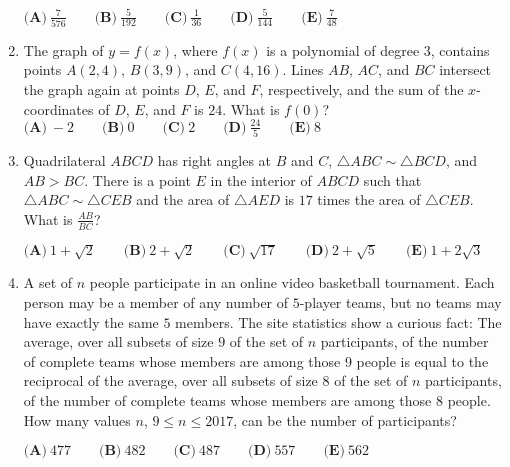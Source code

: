 \documentclass{article}
\begin{document}
\begin{enumerate}[label=\arabic*., itemsep=0.5em]
$\textbf{(A)}\ \frac{7}{576} \qquad \textbf{(B)}\ \frac{5}{192} \qquad \textbf{(C)}\ \frac{1}{36} \qquad \textbf{(D)}\ \frac{5}{144} \qquad\textbf{(E)}\ \frac{7}{48}$\par \vspace{0.5em}\item The graph of $y=f(x)$, where $f(x)$ is a polynomial of degree $3$, contains points $A(2,4)$, $B(3,9)$, and $C(4,16)$. Lines $AB$, $AC$, and $BC$ intersect the graph again at points $D$, $E$, and $F$, respectively, and the sum of the $x$-coordinates of $D$, $E$, and $F$ is $24$. What is $f(0)$?
$\textbf{(A)}\ -2 \qquad \textbf{(B)}\ 0 \qquad \textbf{(C)}\ 2 \qquad \textbf{(D)}\ \frac{24}{5} \qquad\textbf{(E)}\ 8$\par \vspace{0.5em}\item Quadrilateral $ABCD$ has right angles at $B$ and $C$, $\triangle ABC \sim \triangle BCD$, and $AB > BC$. There is a point $E$ in the interior of $ABCD$ such that $\triangle ABC \sim \triangle CEB$ and the area of $\triangle AED$ is $17$ times the area of $\triangle CEB$. What is $\frac{AB}{BC}$?

$\textbf{(A)}\ 1 + \sqrt{2} \qquad \textbf{(B)}\ 2 + \sqrt{2} \qquad \textbf{(C)}\ \sqrt{17} \qquad \textbf{(D)}\ 2 + \sqrt{5} \qquad\textbf{(E)}\ 1 + 2\sqrt{3}$\par \vspace{0.5em}\item A set of $n$ people participate in an online video basketball tournament. Each person may be a member of any number of $5$-player teams, but no teams may have exactly the same $5$ members. The site statistics show a curious fact: The average, over all subsets of size $9$ of the set of $n$ participants, of the number of complete teams whose members are among those 9 people is equal to the reciprocal of the average, over all subsets of size $8$ of the set of $n$ participants, of the number of complete teams whose members are among those $8$ people. How many values $n$, $9 \leq n \leq 2017$, can be the number of participants?

$\textbf{(A)}\ 477 \qquad \textbf{(B)}\ 482 \qquad \textbf{(C)}\ 487 \qquad \textbf{(D)}\ 557 \qquad\textbf{(E)}\ 562$\par \vspace{0.5em}\end{enumerate}
\end{document}
